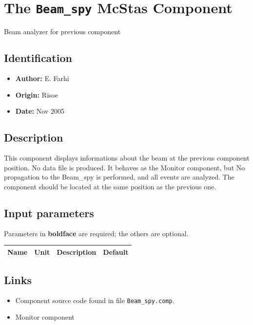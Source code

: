 \section{The \texttt{Beam\_spy} McStas Component}
Beam analyzer for previous component

\subsection*{Identification}
\begin{itemize}
  \item \textbf{Author:} E. Farhi
  \item \textbf{Origin:} Risoe
  \item \textbf{Date:} Nov 2005
\end{itemize}

\subsection*{Description}
This component displays informations about the beam at the previous component position. No data file is produced. It behaves as the Monitor component, but No propagation to the Beam\_spy is performed, and all events are analyzed. The component should be located at the same position as the previous one.

\subsection*{Input parameters}
Parameters in \textbf{boldface} are required; the others are optional.

\begin{longtable}{p{}p{}p{}p{}}
\toprule
\textbf{Name} & \textbf{Unit} & \textbf{Description} & \textbf{Default} \\
\midrule
\endhead
\bottomrule
\end{longtable}

\subsection*{Links}
\begin{itemize}
  \item Component source code found in file \texttt{Beam\_spy.comp}.
  \item Monitor component
\end{itemize}
